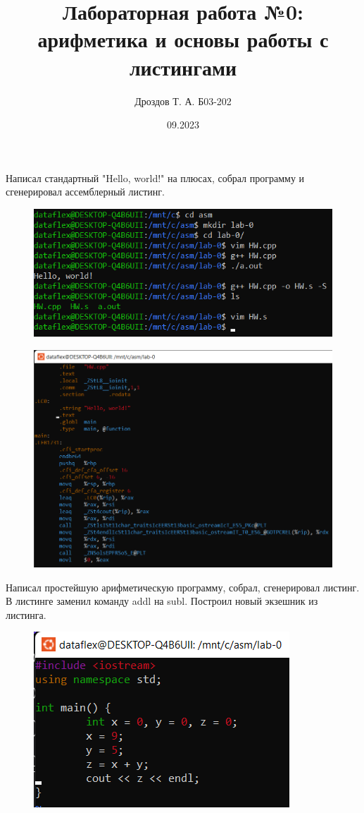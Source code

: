 \documentclass[a4paper,12pt]{article}
\begin{document}
\title{Лабораторная работа №0: арифметика и основы работы с листингами}
\author{Дроздов Т. А. Б03-202}
\date{09.2023}

Написал стандартный  "Hello, world!" на плюсах, собрал программу и сгенерировал ассемблерный листинг. 

\begin{figure}[h] %
	\centering
	\includegraphics[width=0.8\linewidth]{command_line_asm.png}
\end{figure}


\begin{figure}[h] %
	\centering
	\includegraphics[width=0.8\linewidth]{HW s.png}
\end{figure}



Написал простейшую арифметическую программу, собрал, сгенерировал листинг. В листинге заменил команду addl на subl. Построил новый экзешник из листинга.


\begin{figure}[h] %
	\centering
	\includegraphics[width=0.8\linewidth]{arithmetic cpp.png}
\end{figure}
\end{document}
